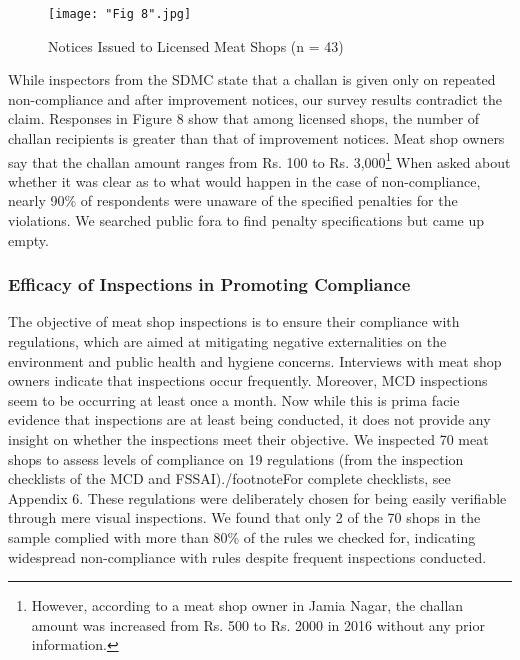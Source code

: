 \documentclass[a4paper, 12pt, twoside]{article}
\begin{document}
\begin{figure}[H]
\centering
\texttt{[image: "Fig 8".jpg]}
\captionsetup{justification=centering}\caption[Optional Caption]{Notices Issued to Licensed Meat Shops (n = 43)\footnotemark }
\end{figure}

While inspectors from the SDMC state that a challan is given only on repeated non-compliance and after improvement notices, our survey results contradict the claim. Responses in Figure 8 show that among licensed shops, the number of challan recipients is greater than that of improvement notices. Meat shop owners say that the challan amount ranges from Rs. 100 to Rs. 3,000\footnote{However, according to a meat shop owner in Jamia Nagar, the challan amount was increased from Rs. 500 to Rs. 2000 in 2016 without any prior information.} When asked about whether it was clear as to what would happen in the case of non-compliance, nearly 90\% of respondents were unaware of the specified penalties for the violations. We searched public fora to find penalty specifications but came up empty.

\subsubsection{Efficacy of Inspections in Promoting Compliance}

The objective of meat shop inspections is to ensure their compliance with regulations, which are aimed at mitigating negative externalities on the environment and public health and hygiene concerns. Interviews with meat shop owners indicate that inspections occur frequently. Moreover, MCD inspections seem to be occurring at least once a month. Now while this is prima facie evidence that inspections are at least being conducted, it does not provide any insight on whether the inspections meet their objective. We inspected 70 meat shops to assess levels of compliance on 19 regulations (from the inspection checklists of the MCD and FSSAI)./footnote{For complete checklists, see Appendix 6.} These regulations were deliberately chosen for being easily verifiable through mere visual inspections. We found that only 2 of the 70 shops in the sample complied with more than 80\% of the rules we checked for, indicating widespread non-compliance with rules despite frequent inspections conducted. \\
\end{document}
